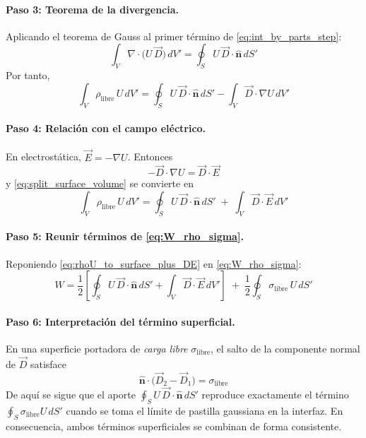 \documentclass{article}
\begin{document}
\paragraph{Paso 3: Teorema de la divergencia.}
Aplicando el teorema de Gauss al primer término de \eqref{eq:int_by_parts_step}:
\begin{equation}
\label{eq:gauss_surface}
\int_V \nabla\!\cdot\!\big(U\,\vec D\big)\,dV'=\oint_S U\,\vec D\!\cdot\!\hat{\boldsymbol n}\,dS'
\end{equation}
Por tanto,
\begin{equation}
\label{eq:split_surface_volume}
\int_V \rho_{\text{libre}}\,U\,dV'
=\oint_S U\,\vec D\!\cdot\!\hat{\boldsymbol n}\,dS' - \int_V \vec D\!\cdot\!\nabla U\,dV'
\end{equation}

\paragraph{Paso 4: Relación con el campo eléctrico.}
En electrostática, \(\vec E=-\nabla U\). Entonces
\begin{equation}
\label{eq:DgradU_to_DE}
-\vec D\!\cdot\!\nabla U=\vec D\!\cdot\!\vec E
\end{equation}
y \eqref{eq:split_surface_volume} se convierte en
\begin{equation}
\label{eq:rhoU_to_surface_plus_DE}
\int_V \rho_{\text{libre}}\,U\,dV'
=\oint_S U\,\vec D\!\cdot\!\hat{\boldsymbol n}\,dS' \;+\; \int_V \vec D\!\cdot\!\vec E\,dV'
\end{equation}

\paragraph{Paso 5: Reunir términos de \eqref{eq:W_rho_sigma}.}
Reponiendo \eqref{eq:rhoU_to_surface_plus_DE} en \eqref{eq:W_rho_sigma}:
\begin{equation}
\label{eq:W_mixture}
W=\frac{1}{2}\left[\oint_S U\,\vec D\!\cdot\!\hat{\boldsymbol n}\,dS' + \int_V \vec D\!\cdot\!\vec E\,dV'\right]
\;+\; \frac{1}{2}\oint_S \sigma_{\text{libre}}\,U\,dS'
\end{equation}

\paragraph{Paso 6: Interpretación del término superficial.}
En una superficie portadora de \emph{carga libre} \(\sigma_{\text{libre}}\), el salto de la componente normal de \(\vec D\) satisface
\begin{equation}
\label{eq:jump_D}
\hat{\boldsymbol n}\!\cdot\!\big(\vec D_{2}-\vec D_{1}\big)=\sigma_{\text{libre}}
\end{equation}
De aquí se sigue que el aporte \(\oint_S U\,\vec D\!\cdot\!\hat{\boldsymbol n}\,dS'\) reproduce exactamente el término \(\oint_S \sigma_{\text{libre}} U\,dS'\) cuando se toma el límite de pastilla gaussiana en la interfaz. En consecuencia, ambos términos superficiales se combinan de forma consistente.
\end{document}
